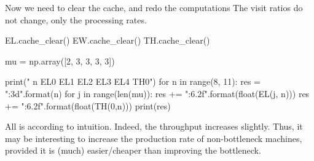 \begin{exercise}
\begin{solution}
\begin{pyconsole}
\end{pyconsole}

Now we need to clear the cache, and redo the computations
The visit ratios do not change, only the processing rates.

\begin{pyconsole}
EL.cache_clear()
EW.cache_clear()
TH.cache_clear()

mu = np.array([2, 3, 3, 3, 3])

print(" n EL0 EL1 EL2 EL3 EL4 TH0")
for n in range(8, 11):
 res = "{:3d}".format(n)
 for j in range(len(mu)):
 res += "{:6.2f}".format(float(EL(j, n)))
 res += "{:6.2f}".format(float(TH(0,n)))
 print(res)
 
\end{pyconsole}

All is according to intuition. Indeed, the throughput increases
slightly. Thus, it may be interesting to increase the production rate
of non-bottleneck machines, provided it is (much) easier/cheaper than
improving the bottleneck.
\end{solution}
\end{exercise}

